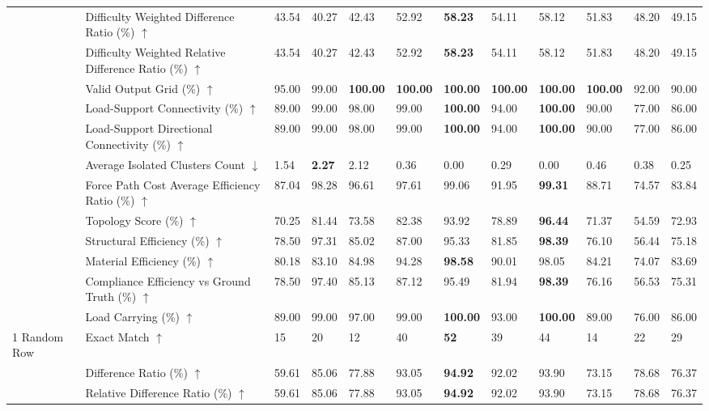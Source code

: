 \begin{table}[!h]
{\begin{tabular}{llllllllllll}
 & Difficulty Weighted Difference Ratio (\%) $\uparrow$ & 43.54 & 40.27 & 42.43 & 52.92 & \textbf{58.23} & 54.11 & 58.12 & 51.83 & 48.20 & 49.15 \\
 & Difficulty Weighted Relative Difference Ratio (\%) $\uparrow$ & 43.54 & 40.27 & 42.43 & 52.92 & \textbf{58.23} & 54.11 & 58.12 & 51.83 & 48.20 & 49.15 \\
 & Valid Output Grid (\%) $\uparrow$ & 95.00 & 99.00 & \textbf{100.00} & \textbf{100.00} & \textbf{100.00} & \textbf{100.00} & \textbf{100.00} & \textbf{100.00} & 92.00 & 90.00 \\
 & Load-Support Connectivity (\%) $\uparrow$ & 89.00 & 99.00 & 98.00 & 99.00 & \textbf{100.00} & 94.00 & \textbf{100.00} & 90.00 & 77.00 & 86.00 \\
 & Load-Support Directional Connectivity (\%) $\uparrow$ & 89.00 & 99.00 & 98.00 & 99.00 & \textbf{100.00} & 94.00 & \textbf{100.00} & 90.00 & 77.00 & 86.00 \\
 & Average Isolated Clusters Count $\downarrow$ & 1.54 & \textbf{2.27} & 2.12 & 0.36 & 0.00 & 0.29 & 0.00 & 0.46 & 0.38 & 0.25 \\
 & Force Path Cost Average Efficiency Ratio (\%) $\uparrow$ & 87.04 & 98.28 & 96.61 & 97.61 & 99.06 & 91.95 & \textbf{99.31} & 88.71 & 74.57 & 83.84 \\
 & Topology Score (\%) $\uparrow$ & 70.25 & 81.44 & 73.58 & 82.38 & 93.92 & 78.89 & \textbf{96.44} & 71.37 & 54.59 & 72.93 \\
 & Structural Efficiency (\%) $\uparrow$ & 78.50 & 97.31 & 85.02 & 87.00 & 95.33 & 81.85 & \textbf{98.39} & 76.10 & 56.44 & 75.18 \\
 & Material Efficiency (\%) $\uparrow$ & 80.18 & 83.10 & 84.98 & 94.28 & \textbf{98.58} & 90.01 & 98.05 & 84.21 & 74.07 & 83.69 \\
 & Compliance Efficiency vs Ground Truth (\%) $\uparrow$ & 78.50 & 97.40 & 85.13 & 87.12 & 95.49 & 81.94 & \textbf{98.39} & 76.16 & 56.53 & 75.31 \\
 & Load Carrying (\%) $\uparrow$ & 89.00 & 99.00 & 97.00 & 99.00 & \textbf{100.00} & 93.00 & \textbf{100.00} & 89.00 & 76.00 & 86.00 \\
1 Random Row & Exact Match $\uparrow$ & 15 & 20 & 12 & 40 & \textbf{52} & 39 & 44 & 14 & 22 & 29 \\
 & Difference Ratio (\%) $\uparrow$ & 59.61 & 85.06 & 77.88 & 93.05 & \textbf{94.92} & 92.02 & 93.90 & 73.15 & 78.68 & 76.37 \\
 & Relative Difference Ratio (\%) $\uparrow$ & 59.61 & 85.06 & 77.88 & 93.05 & \textbf{94.92} & 92.02 & 93.90 & 73.15 & 78.68 & 76.37 \\

\end{tabular}}
\end{table}
